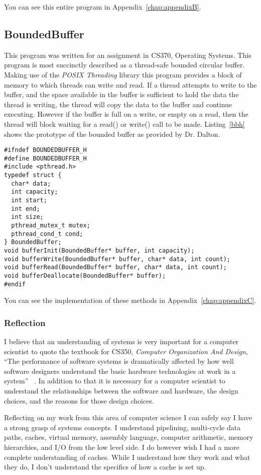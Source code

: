 You can see this entire program in Appendix~\ref{chap:appendixB}.

\subsection{BoundedBuffer}
This program was written for an assignment in CS370, Operating Systems. This program is most succinctly described as a thread-safe bounded circular buffer. Making use of the \textit{POSIX Threading} library this program provides a block of memory to which threads can write and read. If a thread attempts to write to the buffer, and the space available in the buffer is sufficient to hold the data the thread is writing, the thread will copy the data to the buffer and continue executing. However if the buffer is full on a write, or empty on a read, then the thread will block waiting for a read() or write() call to be made. Listing~\ref{bbh} shows the prototype of the bounded buffer as provided by Dr. Dalton.
\lstset{language=c,basicstyle=\footnotesize,numbers=left,numberstyle=\footnotesize,label=bbh}
\begin{lstlisting}
#ifndef BOUNDEDBUFFER_H
#define BOUNDEDBUFFER_H
#include <pthread.h>
typedef struct {
  char* data;
  int capacity;
  int start;
  int end;
  int size;
  pthread_mutex_t mutex;
  pthread_cond_t cond;
} BoundedBuffer;
void bufferInit(BoundedBuffer* buffer, int capacity);
void bufferWrite(BoundedBuffer* buffer, char* data, int count);
void bufferRead(BoundedBuffer* buffer, char* data, int count);
void bufferDeallocate(BoundedBuffer* buffer);
#endif
\end{lstlisting}

You can see the implementation of these methods in Appendix~\ref{chap:appendixC}.
\subsubsection{Reflection}
I believe that an understanding of systems is very important for a computer scientist to quote the textbook for CS350, \textit{Computer Organization And Design}, ``The performance of software systems is dramatically affected by how well software designers understand the basic hardware technologies at work in a system'' ~\cite{pat94}. In addition to that it is necessary for a computer scientist to understand the relationships between the software and hardware, the design choices, and the reasons for those design choices. 

Reflecting on my work from this area of computer science I can safely say I have a strong grasp of systems concepts. I understand pipelining, multi-cycle data paths, caches, virtual memory, assembly language, computer arithmetic, memory hierarchies, and I/O from the low level side. I do however wish I had a more complete understanding of caches. While I understand how they work and what they do, I don't understand the specifics of how a cache is set up.

